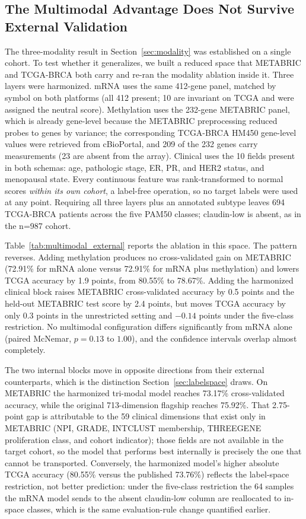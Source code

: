 \documentclass[11pt,a4paper]{article}
\begin{document}
\subsection{The Multimodal Advantage Does Not Survive External Validation}
\label{sec:external_multimodal}

The three-modality result in Section~\ref{sec:modality} was established on a single cohort. To
test whether it generalizes, we built a reduced space that METABRIC and TCGA-BRCA both carry and
re-ran the modality ablation inside it. Three layers were harmonized. mRNA uses the same 412-gene
panel, matched by symbol on both platforms (all 412 present; 10 are invariant on TCGA and were
assigned the neutral score). Methylation uses the 232-gene METABRIC panel, which is already
gene-level because the METABRIC preprocessing reduced probes to genes by variance; the
corresponding TCGA-BRCA HM450 gene-level values were retrieved from cBioPortal, and 209 of the
232 genes carry measurements (23 are absent from the array). Clinical uses the 10 fields present
in both schemas: age, pathologic stage, ER, PR, and HER2 status, and menopausal state. Every
continuous feature was rank-transformed to normal scores \emph{within its own cohort}, a
label-free operation, so no target labels were used at any point. Requiring all three layers plus
an annotated subtype leaves 694 TCGA-BRCA patients across the five PAM50 classes; claudin-low is
absent, as in the n=987 cohort.

Table~\ref{tab:multimodal_external} reports the ablation in this space. The pattern reverses. Adding
methylation produces no cross-validated gain on METABRIC (72.91\% for mRNA alone versus 72.91\% for
mRNA plus methylation) and lowers TCGA accuracy by 1.9 points, from 80.55\% to 78.67\%. Adding the
harmonized clinical block raises METABRIC cross-validated accuracy by 0.5 points and the held-out
METABRIC test score by 2.4 points, but moves TCGA accuracy by only 0.3 points in the unrestricted
setting and $-0.14$ points under the five-class restriction. No multimodal configuration differs
significantly from mRNA alone (paired McNemar, $p = 0.13$ to $1.00$), and the confidence intervals
overlap almost completely.

The two internal blocks move in opposite directions from their external counterparts, which is the
distinction Section~\ref{sec:labelspace} draws. On METABRIC the harmonized tri-modal model reaches
73.17\% cross-validated accuracy, while the original 713-dimension flagship reaches 75.92\%. That
2.75-point gap is attributable to the 59 clinical dimensions that exist only in METABRIC (NPI,
GRADE, INTCLUST membership, THREEGENE proliferation class, and cohort indicator); those fields are
not available in the target cohort, so the model that performs best internally is precisely the one
that cannot be transported. Conversely, the harmonized model's higher absolute TCGA accuracy
(80.55\% versus the published 73.76\%) reflects the label-space restriction, not better prediction:
under the five-class restriction the 64 samples the mRNA model sends to the absent claudin-low
column are reallocated to in-space classes, which is the same evaluation-rule change quantified
earlier.
\end{document}
